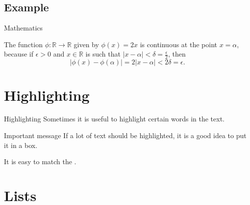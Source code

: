 \documentclass[UKenglish]{beamer}
\begin{document}
\subsection{Example}

\begin{frame}{Mathematics}
    \begin{example}
        The function \(\phi \colon \mathbb{R} \to \mathbb{R}\) given by
        \(\phi(x) = 2x\) is continuous at the point \(x = \alpha\),
        because if \(\epsilon > 0\) and \(x \in \mathbb{R}\) is such that
        \(\lvert x - \alpha \rvert < \delta = \frac{\epsilon}{2}\),
        then
        \begin{equation*}
            \lvert \phi(x) - \phi(\alpha)\rvert = 2\lvert x - \alpha \rvert <
            2\delta = \epsilon.
        \end{equation*}
    \end{example}
\end{frame}

\section{Highlighting}
\SectionPage

\begin{frame}{Highlighting}
    Sometimes it is useful to \alert{highlight} certain words in the text.

    \begin{alertblock}{Important message}
        If a lot of text should be \alert{highlighted}, it is a good idea to
        put it in a box.
    \end{alertblock}

    It is easy to match the .
\end{frame}

\section{Lists}
\end{document}

